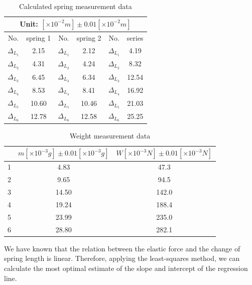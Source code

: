     \begin{table}[htbp]
        \centering
        \label{spring*}
        \begin{tabular}{|c|c|c|c|c|c|}
            \hline
            \multicolumn{6}{|c|}{Unit: $[\times 10^{-2}m]\pm 0.01[\times 10^{-2}m]$}\\ \hline
            No. & spring 1 & No. & spring 2 & No. & series\\ \hline
            $\Delta_{L_1}$ & 2.15 & $\Delta_{L_1}$ & 2.12 & $\Delta_{L_1}$ & 4.19\\ \hline
            $\Delta_{L_2}$ & 4.31 & $\Delta_{L_2}$ & 4.24 & $\Delta_{L_2}$ & 8.32\\ \hline
            $\Delta_{L_3}$ & 6.45 & $\Delta_{L_3}$ & 6.34 & $\Delta_{L_3}$ & 12.54\\ \hline
            $\Delta_{L_4}$ & 8.53 & $\Delta_{L_4}$ & 8.41 & $\Delta_{L_4}$ & 16.92\\ \hline
            $\Delta_{L_5}$ & 10.60 & $\Delta_{L_5}$ & 10.46 & $\Delta_{L_5}$ & 21.03\\ \hline
            $\Delta_{L_6}$ & 12.78 & $\Delta_{L_6}$ & 12.58 & $\Delta_{L_6}$ & 25.25\\ \hline
        \end{tabular}
        \caption{Calculated spring measurement data}
    \end{table}
    \begin{table}[htbp]
        \centering
        \label{weight}
        \begin{tabular}{|c|c|c|}
            \hline
            & $m[\times 10^{-3}g]\pm 0.01[\times 10^{-3}g]$ & $W[\times 10^{-3}N]\pm 0.01[\times 10^{-3}N]$\\ \hline
            1 & 4.83 & 47.3\\ \hline
            2 & 9.65 & 94.5\\ \hline
            3 & 14.50 & 142.0\\ \hline
            4 & 19.24 & 188.4\\ \hline
            5 & 23.99 & 235.0\\ \hline
            6 & 28.80 & 282.1\\ \hline            
        \end{tabular}
        \caption{Weight measurement data}
    \end{table}
    We have known that the relation between the elastic force and the change of spring length is linear. Therefore, applying the least-squares method, we can calculate the most optimal estimate of the slope and intercept of the regression line.\\
